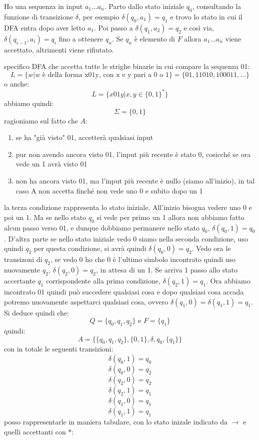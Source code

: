 Ho una sequenza in input $a_1...a_n$. Parto dallo stato iniziale $q_0$, consultando la funzione di transizione $\delta$, per esempio  $\delta(q_0,a_1)=q_1$ e trovo lo stato in cui il DFA entra dopo aver letto $a_1$. Poi passo a $\delta(q_1,a_2)=q_2$ e così via, $\delta(q_{i-1},a_i)=q_i$ fino a ottenere $q_n$. Se $q_n$ è elemento di $F$ allora $a_1...a_n$ viene accettato, altrimenti viene rifiutato.
\begin{esempio}
specifico DFA che accetta tutte le strighe binarie in cui compare la sequenza 01:
$$L=\{w|w \mbox{ è della forma x01y, con x e y pari a 0 o 1} \}=\{01,11010,100011,...\}$$
o anche:
$$L=\{x01y| x,y\in\{0,1\}^* \}$$
abbiamo quindi:
$$\Sigma=\{0,1\}$$
ragioniamo sul fatto che $A$:
\begin{enumerate}
\item se ha "già visto" 01, accetterà qualsiasi input
\item pur non avendo ancora visto 01, l'input più recente è stato 0, cosicché se ora vede un 1 avrà visto 01
\item non ha ancora visto 01, ma l'input più recente è nullo (siamo all'inizio), in tal caso A non accetta finché non vede
uno 0 e subito dopo un 1
\end{enumerate} 
la terza condizione rappresenta lo stato iniziale. All'inizio bisogna vedere uno 0 e poi un 1. Ma se nello stato $q_0$ si vede per primo un 1 allora non abbiamo fatto alcun passo verso 01, e dunque dobbiamo permanere nello stato $q_0$, $\delta(q_0,1)=q_0$. D'altra parte se nello stato iniziale vedo 0 siamo nella seconda condizione, uso quindi $q_2$ per questa condizione, si avrà quindi $\delta(q_0,0)=q_2$. Vedo ora le transizoni di $q_2$, se vedo 0 ho che 0 è l'ultimo simbolo incontrato quindi uso nuovamente $q_2$, $\delta(q_2,0)=q_2$, in attesa di un 1. Se arriva 1 passo allo stato accertante $q_1$ corrispondente alla prima condizione, $\delta(q_2,1)=q_1$. Ora abbiamo incontrato 01 quindi può succedere qualsiasi cosa e dopo qualsiasi cosa accada potremo nuovamente aspettarci qualsiasi cosa, ovvero $\delta(q_1,0)=\delta(q_1,1)=q_1$. Si deduce quindi che:
$$Q=\{q_0,q_1,q_2\} \mbox{ e } F=\{q_1\}$$
quindi:
$$A=\{\{q_0,q_1,q_2\} ,\{0,1\}, \delta, q_0, \{q_1\} \}$$
con in totale le seguenti transizioni:
$$\delta(q_0,1)=q_0$$
$$\delta(q_0,0)=q_2$$
$$\delta(q_2,0)=q_2$$
$$\delta(q_2,1)=q_1$$
$$\delta(q_1,0)=q_1$$
$$\delta(q_1,1)=q_1$$
posso rappresentarle in maniera tabulare, con lo stato inizale indicato da $\to$ e quelli accettanti con $*$:
\begin{center}
\begin{tabular}{c|c|c}

\end{tabular}
\end{center}
\end{esempio}
